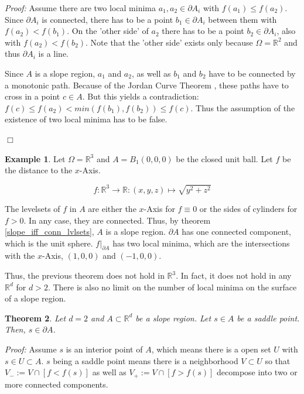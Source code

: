 \documentclass[a4paper,10pt,notitlepage,fullpage]{paper}
\theoremstyle{plain}
\newtheorem{thm}{Theorem}[section] %
\theoremstyle{definition}
\newtheorem{exmp}[thm]{Example} %
\begin{document}
\emph{Proof:} Assume there are two local minima $a_1, a_2 \in \partial A_i$ with $f(a_1) \leq f(a_2)$.
Since $\partial A_i$ is connected, there has to be a point $b_1 \in \partial A_i$ between them with $f(a_2) < f(b_1)$.
On the 'other side' of $a_2$ there has to be a point $b_2 \in \partial A_i$, also with $f(a_2) < f(b_2)$.
Note that the 'other side' exists only because $\Omega = \mathbb R^2$ and thus $\partial A_i$ is a line.

Since $A$ is a slope region, $a_1$ and $a_2$, as well as $b_1$ and $b_2$ have to be connected by a monotonic path.
Because of the Jordan Curve Theorem \cite{jordan1887cours}, these paths have to cross in a point $c \in A$.
But this yields a contradiction: $f(c) \leq f(a_2) < min(f(b_1), f(b_2)) \leq f(c)$.
Thus the assumption of the existence of two local minima has to be false.

\hfill $\Box$

\begin{exmp}
Let $\Omega = \mathbb R^3$ and $A = B_1(0,0,0)$ be the closed unit ball.
Let $f$ be the distance to the $x$-Axis. 

\begin{equation*}
f: \mathbb R^3 \to \mathbb R: (x,y,z) \mapsto \sqrt{y^2 + z^2}
\end{equation*}

The levelsets of $f$ in $A$ are either the $x$-Axis for $f \equiv 0$ or the sides of cylinders for $f > 0$.
In any case, they are connected.
Thus, by theorem \ref{slope_iff_conn_lvlsets}, $A$ is a slope region.
$\partial A$ has one connected component, which is the unit sphere.
$f|_{\partial A}$ has two local minima, which are the intersections with the $x$-Axis, $(1,0,0)$ and $(-1,0,0)$.
\end{exmp}

Thus, the previous theorem does not hold in $\mathbb R^3$.
In fact, it does not hold in any $\mathbb R^d$ for $d > 2$.
There is also no limit on the number of local minima on the surface of a slope region.

\begin{thm}
\label{thm:saddle_on_border}
Let $d = 2$ and $A \subset \mathbb R^d$ be a slope region.
Let $s \in A$ be a saddle point.
Then, $s \in \partial A$.
\end{thm}

\emph{Proof:} Assume $s$ is an interior point of $A$, which means there is a open set $U$ with $s \in U \subset A$.
$s$ being a saddle point means there is a neighborhood $V \subset U$ so that $V_- := V \cap [f < f(s)]$ as well as $V_+ := V \cap [f > f(s)]$ decompose into two or more connected components.
\end{document}
